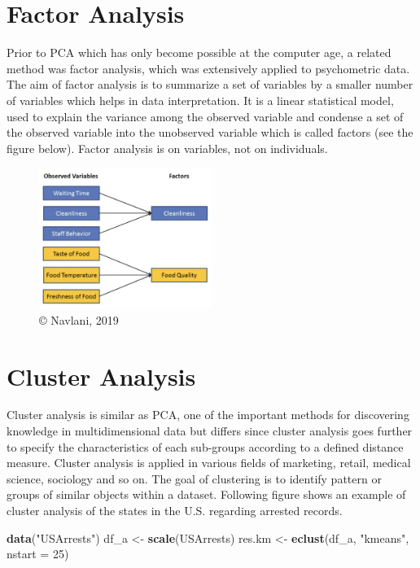 \documentclass[]{book}
\newenvironment{Shaded}{\begin{snugshade}}{\end{snugshade}}
\newcommand{\DataTypeTok}[1]{\textcolor[rgb]{0.13,0.29,0.53}{#1}}
\newcommand{\DecValTok}[1]{\textcolor[rgb]{0.00,0.00,0.81}{#1}}
\newcommand{\KeywordTok}[1]{\textcolor[rgb]{0.13,0.29,0.53}{\textbf{#1}}}
\newcommand{\NormalTok}[1]{#1}
\newcommand{\StringTok}[1]{\textcolor[rgb]{0.31,0.60,0.02}{#1}}
\begin{document}
\hypertarget{factor-analysis}{%
\section{Factor Analysis}\label{factor-analysis}}

Prior to PCA which has only become possible at the computer age, a related method was factor analysis, which was extensively applied to psychometric data. The aim of factor analysis is to summarize a set of variables by a smaller number of variables which helps in data interpretation. It is a linear statistical model, used to explain the variance among the observed variable and condense a set of the observed variable into the unobserved variable which is called factors (see the figure below). Factor analysis is on variables, not on individuals.

\begin{figure}
\centering
\includegraphics[width=0.5\textwidth,height=\textheight]{Factoranalysis.png}
\caption{© Navlani, 2019}
\end{figure}

\hypertarget{cluster-analysis}{%
\section{Cluster Analysis}\label{cluster-analysis}}

Cluster analysis is similar as PCA, one of the important methods for discovering knowledge in multidimensional data but differs since cluster analysis goes further to specify the characteristics of each sub-groups according to a defined distance measure.
Cluster analysis is applied in various fields of marketing, retail, medical science, sociology and so on.
The goal of clustering is to identify pattern or groups of similar objects within a dataset.
Following figure shows an example of cluster analysis of the states in the U.S. regarding arrested records.

\begin{Shaded}
\begin{Highlighting}[]
\KeywordTok{data}\NormalTok{(}\StringTok{"USArrests"}\NormalTok{)}
\NormalTok{df_a <-}\StringTok{ }\KeywordTok{scale}\NormalTok{(USArrests)}
\NormalTok{res.km <-}\StringTok{ }\KeywordTok{eclust}\NormalTok{(df_a, }\StringTok{"kmeans"}\NormalTok{, }\DataTypeTok{nstart =} \DecValTok{25}\NormalTok{)}
\end{Highlighting}
\end{Shaded}
\end{document}
